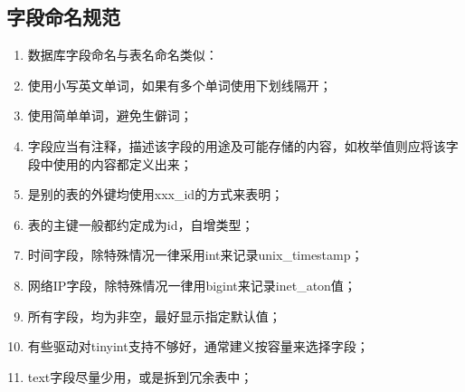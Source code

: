 \subsection{字段命名规范}
\begin{enumerate}
    \item 数据库字段命名与表名命名类似：

    \item 使用小写英文单词，如果有多个单词使用下划线隔开；

    \item 使用简单单词，避免生僻词；

    \item 字段应当有注释，描述该字段的用途及可能存储的内容，如枚举值则应将该字段中使用的内容都定义出来；

    \item 是别的表的外键均使用xxx\_id的方式来表明；

    \item 表的主键一般都约定成为id，自增类型；

    \item 时间字段，除特殊情况一律采用int来记录unix\_timestamp；

    \item 网络IP字段，除特殊情况一律用bigint来记录inet\_aton值；

    \item 所有字段，均为非空，最好显示指定默认值；

    \item 有些驱动对tinyint支持不够好，通常建义按容量来选择字段；

    \item  text字段尽量少用，或是拆到冗余表中；
\end{enumerate}


